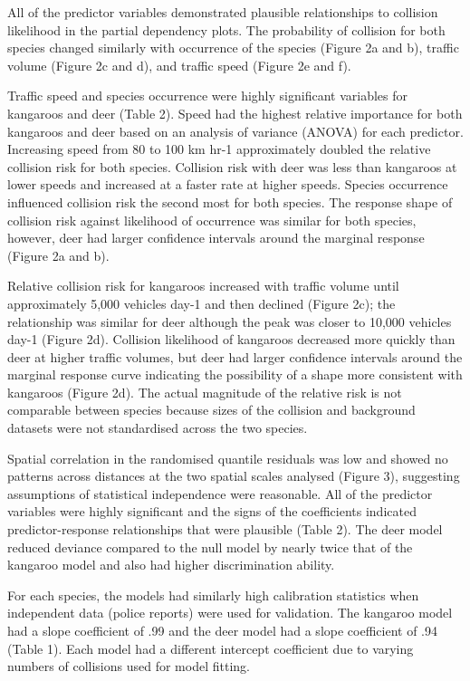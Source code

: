 All of the predictor variables demonstrated plausible relationships to collision likelihood in the partial dependency plots. The probability of collision for both species changed similarly with occurrence of the species (Figure 2a and b), traffic volume (Figure 2c and d), and traffic speed (Figure 2e and f).

Traffic speed and species occurrence were highly significant variables for kangaroos and deer (Table 2). Speed had the highest relative importance for both kangaroos and deer based on an analysis of variance (ANOVA) for each predictor. Increasing speed from 80 to 100 km hr-1 approximately doubled the relative collision risk for both species.  Collision risk with deer was less than kangaroos at lower speeds and increased at a faster rate at higher speeds. Species occurrence influenced collision risk the second most for both species.  The response shape of collision risk against likelihood of occurrence was similar for both species, however, deer had larger confidence intervals around the marginal response (Figure 2a and b).

Relative collision risk  for kangaroos increased with traffic volume until approximately 5,000 vehicles day-1 and then declined (Figure 2c); the relationship was similar for deer although the peak was closer to 10,000 vehicles day-1 (Figure 2d). Collision likelihood of kangaroos decreased more quickly than deer at higher traffic volumes, but deer had larger confidence intervals around the marginal response curve indicating the possibility of a shape more consistent with kangaroos (Figure 2d). The actual magnitude of the relative risk is not comparable between species because sizes of the collision and background datasets were not standardised across the two species.

Spatial correlation in the randomised quantile residuals was low and showed no patterns across distances at the two spatial scales analysed (Figure 3), suggesting assumptions of statistical independence were reasonable. All of the predictor variables were highly significant and the signs of the coefficients indicated predictor-response relationships that were plausible (Table 2). The deer model reduced deviance compared to the null model by nearly twice that of the kangaroo model and also had higher discrimination ability.

For each species, the models had similarly high calibration statistics when independent data (police reports) were used for validation. The kangaroo model had a slope coefficient of .99 and the deer model had a slope coefficient of .94 (Table 1). Each model had a different intercept coefficient due to varying numbers of collisions used for model fitting.

